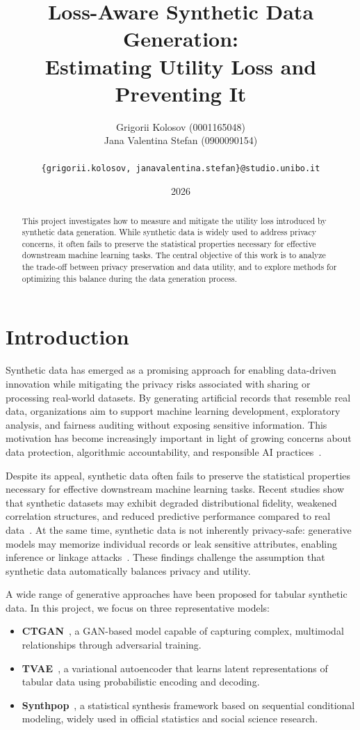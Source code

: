 \documentclass[11pt]{article}
\title{\textbf{Loss-Aware Synthetic Data Generation:}\\
Estimating Utility Loss and Preventing It}
\author{
Grigorii Kolosov (0001165048) \\
Jana Valentina Stefan (0900090154) \\
\\
\texttt{\{grigorii.kolosov, janavalentina.stefan\}@studio.unibo.it}
}
\date{2026}
\begin{document}
\maketitle

\begin{abstract}
This project investigates how to measure and mitigate the utility loss introduced by synthetic data generation. While synthetic data is widely used to address privacy concerns, it often fails to preserve the statistical properties necessary for effective downstream machine learning tasks. The central objective of this work is to analyze the trade-off between privacy preservation and data utility, and to explore methods for optimizing this balance during the data generation process.
\end{abstract}

\section{Introduction}

Synthetic data has emerged as a promising approach for enabling data-driven innovation while mitigating the privacy risks associated with sharing or processing real-world datasets. By generating artificial records that resemble real data, organizations aim to support machine learning development, exploratory analysis, and fairness auditing without exposing sensitive information. This motivation has become increasingly important in light of growing concerns about data protection, algorithmic accountability, and responsible AI practices~\cite{leslie2020ethics, floridi2016data}.

Despite its appeal, synthetic data often fails to preserve the statistical properties necessary for effective downstream machine learning tasks. Recent studies show that synthetic datasets may exhibit degraded distributional fidelity, weakened correlation structures, and reduced predictive performance compared to real data~\cite{little2025synthetic}. At the same time, synthetic data is not inherently privacy-safe: generative models may memorize individual records or leak sensitive attributes, enabling inference or linkage attacks~\cite{stadler2022synthetic}. These findings challenge the assumption that synthetic data automatically balances privacy and utility.

A wide range of generative approaches have been proposed for tabular synthetic data. In this project, we focus on three representative models:

\begin{itemize}
    \item \textbf{CTGAN}~\cite{xu2019modeling}, a GAN-based model capable of capturing complex, multimodal relationships through adversarial training.
    \item \textbf{TVAE}~\cite{xu2018synthesizing}, a variational autoencoder that learns latent representations of tabular data using probabilistic encoding and decoding.
    \item \textbf{Synthpop}~\cite{nowok2016synthpop}, a statistical synthesis framework based on sequential conditional modeling, widely used in official statistics and social science research.
\end{itemize}
\end{document}
